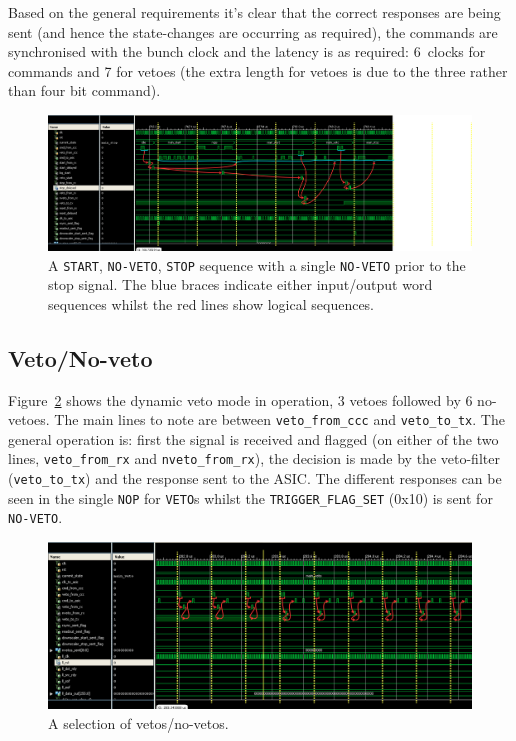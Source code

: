 Based on the general requirements it's clear that the correct responses are being sent (and hence the state-changes are occurring as required), the commands are synchronised with the bunch clock and the latency is as required: 6~clocks for commands and 7 for vetoes (the extra length for vetoes is due to the three rather than four bit command).

\begin{figure}[htbp]
  \centering
  \includegraphics[width=\textwidth]{images/isim/edited/start-veto-stop.png}
  \caption{A \texttt{START}, \texttt{NO-VETO}, \texttt{STOP} sequence with a single \texttt{NO-VETO} prior to the stop signal. The blue braces indicate either input/output word sequences whilst the red lines show logical sequences.}
  \label{fig:isim_start-veto-stop}
\end{figure}
\subsection{Veto/No-veto} %
\label{sec:veto_no_veto}
Figure~\ref{fig:isim_veto_no_veto} shows the dynamic veto mode in operation, 3 vetoes followed by 6 no-vetoes. The main lines to note are between \texttt{veto\_from\_ccc} and \texttt{veto\_to\_tx}. The general operation is: first the signal is received and flagged (on either of the two lines, \texttt{veto\_from\_rx} and \texttt{nveto\_from\_rx}), the decision is made by the veto-filter (\texttt{veto\_to\_tx}) and the response sent to the ASIC. The different responses can be seen in the single \texttt{NOP} for \texttt{VETO}s whilst the \texttt{TRIGGER\_FLAG\_SET} (0x10) is sent for \texttt{NO-VETO}. 

\begin{figure}[htbp]
  \centering
  \includegraphics[width=\textwidth]{images/isim/edited/veto_no_veto.png}
  \caption{A selection of vetos/no-vetos.}
  \label{fig:isim_veto_no_veto}
\end{figure}
